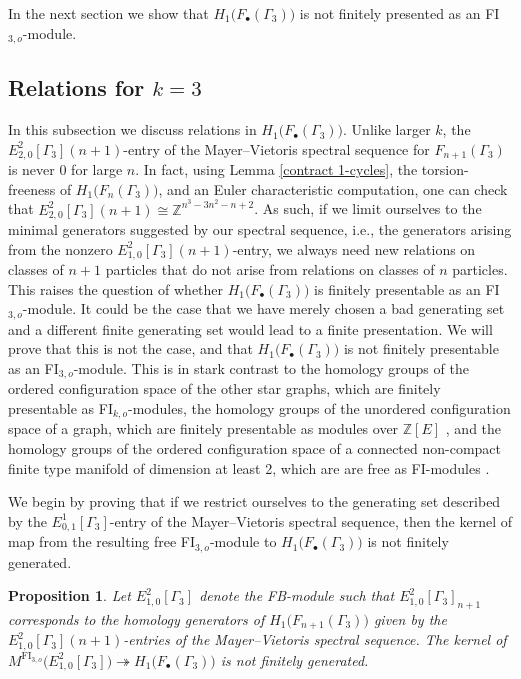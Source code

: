 \documentclass[pagebackref,colorlinks,citecolor=blue,linkcolor=blue,urlcolor=blue,filecolor=blue]{article}
\newtheorem{prop}[thm]{Proposition}
\theoremstyle{definition}\newtheorem{definition}[thm]{Definition}
\theoremstyle{definition}
\newcommand{\Z}{\ensuremath{\mathbb{Z}}}
\begin{document}
In the next section we show that $H_{1}\big(F_{\bullet}(\Gamma_{3})\big)$ is not finitely presented as an FI$_{3,o}$-module.

\subsection{Relations for $k=3$}

In this subsection we discuss relations in $H_{1}\big(F_{\bullet}(\Gamma_{3})\big)$.
Unlike larger $k$, the $E^{2}_{2,0}[\Gamma_{3}](n+1)$-entry of the Mayer--Vietoris spectral sequence for $F_{n+1}(\Gamma_{3})$ is never $0$ for large $n$.
In fact, using Lemma \ref{contract 1-cycles}, the torsion-freeness of $H_{1}\big(F_{n}(\Gamma_{3})\big)$, and an Euler characteristic computation, one can check that $E^{2}_{2,0}[\Gamma_{3}](n+1)\cong \Z^{n^{3}-3n^{2}-n+2}$.
As such, if we limit ourselves to the minimal generators suggested by our spectral sequence, i.e., the generators arising from the nonzero $E^{2}_{1,0}[\Gamma_{3}](n+1)$-entry, we always need new relations on classes of $n+1$ particles that do not arise from relations on classes of $n$ particles.
This raises the question of whether $H_{1}\big(F_{\bullet}(\Gamma_{3})\big)$ is finitely presentable as an FI$_{3,o}$-module.
It could be the case that we have merely chosen a bad generating set and a different finite generating set would lead to a finite presentation.
We will prove that this is not the case, and that $H_{1}\big(F_{\bullet}(\Gamma_{3})\big)$ is not finitely presentable as an FI$_{3,o}$-module.
This is in stark contrast to the homology groups of the ordered configuration space of the other star graphs, which are finitely presentable as FI$_{k, o}$-modules, the homology groups of the unordered configuration space of a graph, which are finitely presentable as modules over $\Z[E]$ \cite[Theorem 1.1]{an2020edge}, and the homology groups of the ordered configuration space of a connected non-compact finite type manifold of dimension at least 2, which are are free as FI-modules \cite[Theorem 6.4.3]{church2015fi}.

We begin by proving that if we restrict ourselves to the generating set described by the $E^{1}_{0,1}[\Gamma_{3}]$-entry of the Mayer--Vietoris spectral sequence, then the kernel of map from the resulting free FI$_{3,o}$-module to $H_{1}\big(F_{\bullet}(\Gamma_{3})\big)$ is not finitely generated.

\begin{prop}\label{kernel is not finitely generated}
Let $E^{2}_{1,0}[\Gamma_{3}]$ denote the FB-module such that $E^{2}_{1,0}[\Gamma_{3}]_{n+1}$ corresponds to the homology generators of $H_{1}\big(F_{n+1}(\Gamma_{3})\big)$ given by the $E^{2}_{1,0}[\Gamma_{3}](n+1)$-entries of the Mayer--Vietoris spectral sequence.
The kernel of $M^{\text{FI}_{3,o}}\big(E^{2}_{1,0}[\Gamma_{3}]\big)\twoheadrightarrow H_{1}\big(F_{\bullet}(\Gamma_{3})\big)$ is not finitely generated.
\end{prop}
\end{document}
